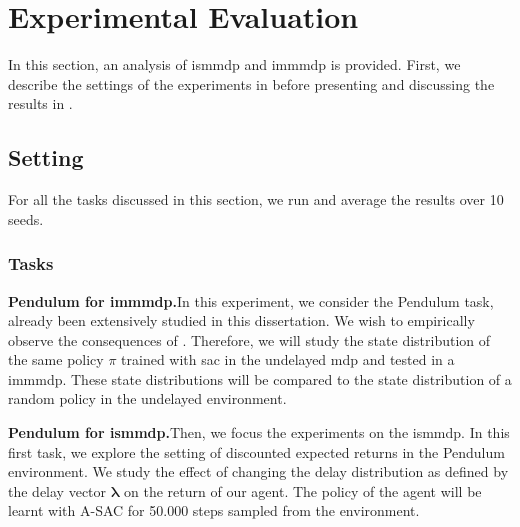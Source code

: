 \section{Experimental Evaluation}
In this section, an analysis of \gls{ismmdp} and \gls{immmdp} is provided.
First, we describe the settings of the experiments in  before presenting and discussing the results in .



\subsection{Setting}
\label{subsec:setting_exp_mtd}
For all the tasks discussed in this section, we run and average the results over 10 seeds.

\subsubsection{Tasks}
\label{subsubsec:tasks_mtd}

\noindent\textbf{Pendulum for \gls{immmdp}.}\indent In this experiment, we consider the Pendulum task, already been extensively studied in this dissertation. 
We wish to empirically observe the consequences of .
Therefore, we will study the state distribution of the same policy $\pi$ trained with \gls{sac} in the undelayed \gls{mdp} and tested in a \gls{immmdp}. 
These state distributions will be compared to the state distribution of a random policy in the undelayed environment.

\noindent\textbf{Pendulum for \gls{ismmdp}.}\indent Then, we focus the experiments on the \gls{ismmdp}. 
In this first task, we explore the setting of discounted expected returns in the Pendulum environment.
We study the effect of changing the delay distribution as defined by the delay vector $\boldsymbol\lambda$ on the return of our agent. 
The policy of the agent will be learnt with A-SAC for 50.000 steps sampled from the environment. 

